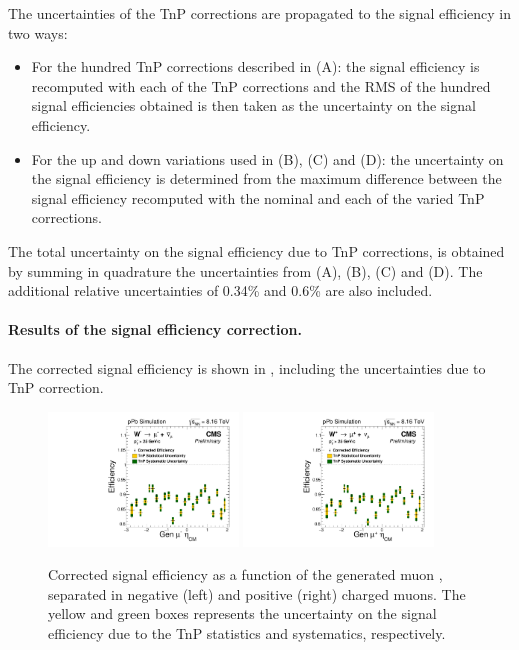 The uncertainties of the TnP corrections are propagated to the signal efficiency in two ways:

\begin{itemize}
 \item For the hundred TnP corrections described in (A): the signal efficiency is recomputed with each of the TnP corrections and the RMS of the hundred signal efficiencies obtained is then taken as the uncertainty on the signal efficiency.
 \item For the up and down variations used in (B), (C) and (D): the uncertainty on the signal efficiency is determined from the maximum difference between the signal efficiency recomputed with the nominal and each of the varied TnP corrections.

\end{itemize}

The total uncertainty on the signal efficiency due to TnP corrections, is obtained by summing in quadrature the uncertainties from (A), (B), (C) and (D). The additional relative uncertainties of 0.34\% and 0.6\% are also included.


\paragraph{Results of the signal efficiency correction.} The corrected signal efficiency is shown in , including the  uncertainties due to TnP correction. 

\begin{figure}[htb!]
 \centering
 \includegraphics[width=0.45\textwidth]{Figures/WBoson/Analysis/Efficiency/eff1D_EtaCM_MC_WToMuNu_PA_Minus_Total_TnP_Nominal}
 \includegraphics[width=0.45\textwidth]{Figures/WBoson/Analysis/Efficiency/eff1D_EtaCM_MC_WToMuNu_PA_Plus_Total_TnP_Nominal}
 \caption{Corrected signal efficiency as a function of the generated muon \etaCM, separated in negative (left) and positive (right) charged muons. The yellow and green boxes represents the uncertainty on the signal efficiency due to the TnP statistics and systematics, respectively.}
 \label{fig:CorrEfficiency}
\end{figure}

